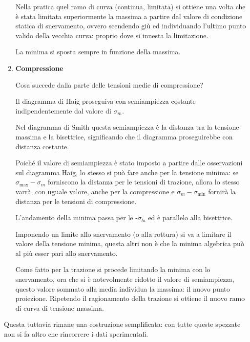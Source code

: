 \begin{enumerate}
				Nella pratica quel ramo di curva (continua, limitata) si ottiene una volta che è stata limitata superiormente la massima a partire dal valore di condizione statica di snervamento, ovvero scendendo giù ed individuando l'ultimo punto valido della vecchia curva: proprio dove si innesta la limitazione.
				
				La minima si sposta sempre in funzione della massima. 
				
				\item \textbf{Compressione} 
				
				Cosa succede dalla parte delle tensioni medie di compressione? 
				
				Il diagramma di Haig proseguiva con semiampiezza costante indipendentemente dal valore di $\sigma_m$.
				
				Nel diagramma di Smith questa semiampiezza è la distanza tra la tensione massima e la bisettrice, significando che il diagramma proseguirebbe con distanza costante. \newline
				
				Poiché il valore di semiampiezza è stato imposto a partire dalle osservazioni sul diagramma Haig, lo stesso si può fare anche per la tensione minima: se $\sigma_{\max} - \sigma_m$ forniscono la distanza per le tensioni di trazione, allora lo stesso varrà, con uguale valore, anche per la compressione e $\sigma_m-\sigma_{\min}$ fornirà la distanza per le tensioni di compressione. 
				
				L'andamento della minima passa per le -$\sigma_{la}$ ed è parallelo alla bisettrice. \newline
				
				Imponendo un limite allo snervamento (o alla rottura) si va a limitare il valore della tensione minima, questa altri non è che la minima algebrica può al più esser pari allo snervamento.
				
				Come fatto per la trazione si procede limitando la minima con lo snervamento, ora che si è notevolmente ridotto il valore di semiampiezza, questo valore sommato alla media individua la massima: il nuovo punto proiezione. Ripetendo il ragionamento della trazione si ottiene il nuovo ramo di curva di tensione massima.
											
			\end{enumerate}
			
			Questa tuttavia rimane una costruzione semplificata: con tutte queste spezzate non si fa altro che rincorrere i dati sperimentali.  
			
